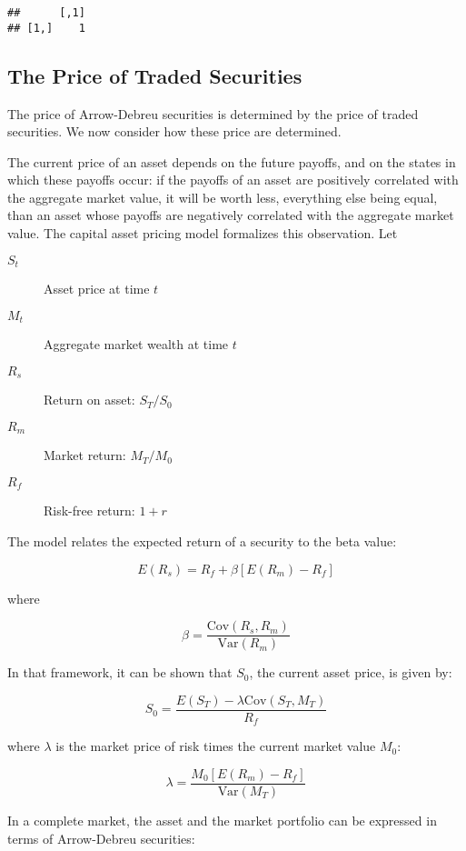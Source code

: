 \documentclass[justified]{tufte-book}
\begin{document}
\begin{verbatim}
##      [,1]
## [1,]    1
\end{verbatim}

\hypertarget{the-price-of-traded-securities}{%
\subsection{The Price of Traded Securities}\label{the-price-of-traded-securities}}

The price of Arrow-Debreu securities is determined by the price of
traded securities. We now consider how these price are determined.

The current price of an asset depends on the future payoffs, and on the
states in which these payoffs occur: if the payoffs of an asset are
positively correlated with the aggregate market value, it will be worth
less, everything else being equal, than an asset whose payoffs are
negatively correlated with the aggregate market value. The capital asset
pricing model formalizes this observation. Let

\begin{description}
\item[\(S_t\)]
Asset price at time \(t\)
\item[\(M_t\)]
Aggregate market wealth at time \(t\)
\item[\(R_s\)]
Return on asset: \(S_T/S_0\)
\item[\(R_m\)]
Market return: \(M_T/M_0\)
\item[\(R_f\)]
Risk-free return: \(1+r\)
\end{description}

The model relates the expected return of a security to the beta value:

\[E(R_s) = R_f + \beta [ E(R_m) - R_f ]\]

where

\[\beta = \frac{\mbox{Cov}(R_s, R_m)}{\mbox{Var}(R_m)}\]

In that framework, it can be shown that \(S_0\), the current asset price,
is given by:

\[S_0 = \frac{E(S_T)-\lambda \mbox{Cov}(S_T, M_T)}{R_f}
    \label{eq:capm1}\]

where \(\lambda\) is the market price of risk times the current market
value \(M_0\):

\[\lambda = \frac{M_0 [ E(R_m)-R_f ]}{\mbox{Var}(M_T)}\]

In a complete market, the asset and the market portfolio can be
expressed in terms of Arrow-Debreu securities:
\end{document}
